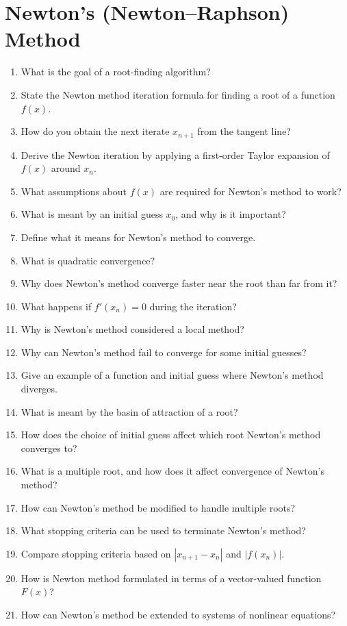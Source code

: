 \section{Newton's (Newton--Raphson) Method}

\begin{enumerate}
  \item What is the goal of a root-finding algorithm?
  \item State the Newton method iteration formula for finding a root of a function $f(x)$.
  \item How do you obtain the next iterate $x_{n+1}$ from the tangent line?
  \item Derive the Newton iteration by applying a first-order Taylor expansion of $f(x)$ around $x_n$.
  \item What assumptions about $f(x)$ are required for Newton's method to work?
  \item What is meant by an initial guess $x_0$, and why is it important?
  \item Define what it means for Newton's method to converge.
  \item What is quadratic convergence?
  \item Why does Newton's method converge faster near the root than far from it?
  \item What happens if $f'(x_n) = 0$ during the iteration?
  \item Why is Newton's method considered a local method?
  \item Why can Newton's method fail to converge for some initial guesses?
  \item Give an example of a function and initial guess where Newton's method diverges.
  \item What is meant by the basin of attraction of a root?
  \item How does the choice of initial guess affect which root Newton's method converges to?
  \item What is a multiple root, and how does it affect convergence of Newton's method?
  \item How can Newton's method be modified to handle multiple roots?
  \item What stopping criteria can be used to terminate Newton's method?
  \item Compare stopping criteria based on $|x_{n+1} - x_n|$ and $|f(x_n)|$.
  \item How is Newton method formulated in terms of a vector-valued function $F(x)$?
  \item How can Newton's method be extended to systems of nonlinear equations?

\end{enumerate}

